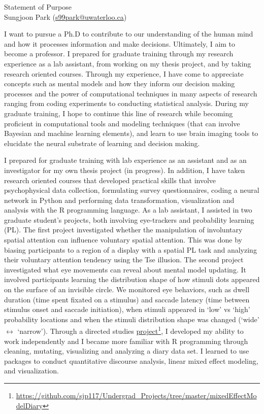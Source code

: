 \documentclass[12pt]{article}
\let\oldcenter\center
\let\oldendcenter\endcenter
\renewenvironment{center}{\setlength\topsep{-1pt}\oldcenter}{\oldendcenter}
\begin{document}
	
	\begin{center}
		{\Large Statement of Purpose} \\
		{\normalsize Sungjoon Park (\href{mailto:s99park@uwaterloo.ca}{s99park@uwaterloo.ca})}
	\end{center}
	
	I want to pursue a Ph.D to contribute to our understanding of the human mind and how it processes information and make decisions. Ultimately, I aim to become a professor. I prepared for graduate training through my research experience as a lab assistant, from working on my thesis project, and by taking research oriented courses. Through my experience, I have come to appreciate concepts such as mental models and how they inform our decision making processes and the power of computational techniques in many aspects of research ranging from coding experiments to conducting statistical analysis. During my graduate training, I hope to continue this line of research while becoming proficient in computational tools and modeling techniques (that can involve Bayesian and machine learning elements), and learn to use brain imaging tools to elucidate the neural substrate of learning and decision making.

	I prepared for graduate training with lab experience as an assistant and as an investigator for my own thesis project (in progress). In addition, I have taken research oriented courses that developed practical skills that involve psychophysical data collection, formulating survey questionnaires, coding a neural network in Python and performing data transformation, visualization and analysis with the R programming language. As a lab assistant, I assisted in two graduate student's projects, both involving eye-trackers and probability learning (PL). The first project investigated whether the manipulation of involuntary spatial attention can influence voluntary spatial attention. This was done by biasing participants to a region of a display with a spatial PL task and analyzing their voluntary attention tendency using the Tse illusion. The second project investigated what eye movements can reveal about mental model updating. It involved participants learning the distribution shape of how stimuli dots appeared on the surface of an invisible circle. We monitored eye behaviors, such as dwell duration (time spent fixated on a stimulus) and saccade latency (time between stimulus onset and saccade initiation), when stimuli appeared in `low' vs `high' probability locations and when the stimuli distribution shape was changed (`wide' $\leftrightarrow$ `narrow'). Through a directed studies \href{https://github.com/sjp117/Undergrad_Projects/tree/master/mixedEffectModelDiary}{project}\footnote{\url{https://github.com/sjp117/Undergrad\_Projects/tree/master/mixedEffectModelDiary}}, I developed my ability to work independently and I became more familiar with R programming through cleaning, mutating, visualizing and analyzing a diary data set. I learned to use packages to conduct quantitative discourse analysis, linear mixed effect modeling, and visualization.
\end{document}
